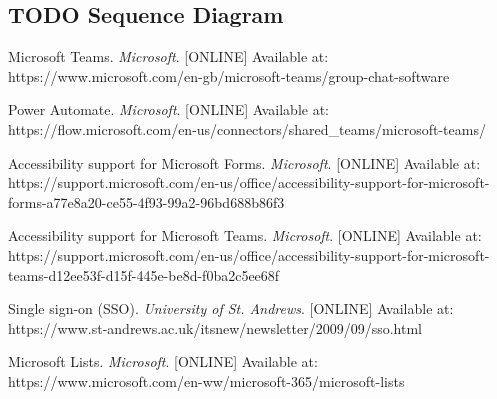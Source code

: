 \documentclass[a4paper,11pt]{article}
\begin{document}
\begin{table}[H]
\begin{tabular}{p{0.27\linewidth}  p{0.67\linewidth}}
\end{tabular}
\end{table}


\newpage
\subsection{TODO Sequence Diagram}

\newpage
{}
\begin{thebibliography}{9}

Microsoft Teams.
{\textit{Microsoft}}. [ONLINE] Available at: https://www.microsoft.com/en-gb/microsoft-teams/group-chat-software

Power Automate.
{\textit{Microsoft}}. [ONLINE] Available at:
https://flow.microsoft.com/en-us/connectors/shared\_teams/microsoft-teams/

Accessibility support for Microsoft Forms.
{\textit{Microsoft}}. [ONLINE] Available at:
https://support.microsoft.com/en-us/office/accessibility-support-for-microsoft-forms-a77e8a20-ce55-4f93-99a2-96bd688b86f3

Accessibility support for Microsoft Teams.
{\textit{Microsoft}}. [ONLINE] Available at:
https://support.microsoft.com/en-us/office/accessibility-support-for-microsoft-teams-d12ee53f-d15f-445e-be8d-f0ba2c5ee68f

Single sign-on (SSO).
{\textit{University of St. Andrews}}. [ONLINE] Available at: https://www.st-andrews.ac.uk/itsnew/newsletter/2009/09/sso.html

Microsoft Lists.
{\textit{Microsoft}}. [ONLINE] Available at: https://www.microsoft.com/en-ww/microsoft-365/microsoft-lists

\end{thebibliography}
\end{document}
